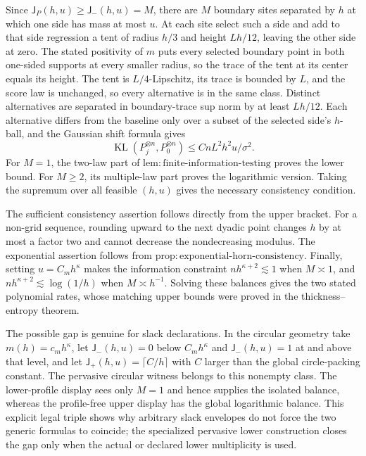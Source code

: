 Since \(\mathsf J_P(h,u)\ge\mathsf J_{-}(h,u)=M\), there are \(M\) boundary sites separated by \(h\) at which one side has mass at most \(u\). At each site select such a side and add to that side regression a tent of radius \(h/3\) and height \(Lh/12\), leaving the other side at zero. The stated positivity of \(m\) puts every selected boundary point in both one-sided supports at every smaller radius, so the trace of the tent at its center equals its height. The tent is \(L/4\)-Lipschitz, its trace is bounded by \(L\), and the score law is unchanged, so every alternative is in the same class. Distinct alternatives are separated in boundary-trace sup norm by at least \(Lh/12\). Each alternative differs from the baseline only over a subset of the selected side's \(h\)-ball, and the Gaussian shift formula gives
\[
 \operatorname{KL}(P_j^{\otimes n},P_0^{\otimes n})
 \le CnL^2h^2u/\sigma^2.
\]
For \(M=1\), the two-law part of \(\mathrm{lem:finite\text{-}information\text{-}testing}\) proves the lower bound. For \(M\ge2\), its multiple-law part proves the logarithmic version. Taking the supremum over all feasible \((h,u)\) gives the necessary consistency condition.

The sufficient consistency assertion follows directly from the upper bracket. For a non-grid sequence, rounding upward to the next dyadic point changes \(h\) by at most a factor two and cannot decrease the nondecreasing modulus. The exponential assertion follows from \(\mathrm{prop:exponential\text{-}horn\text{-}consistency}\). Finally, setting \(u=C_mh^\kappa\) makes the information constraint \(nh^{\kappa+2}\lesssim1\) when \(M\asymp1\), and \(nh^{\kappa+2}\lesssim\log(1/h)\) when \(M\asymp h^{-1}\). Solving these balances gives the two stated polynomial rates, whose matching upper bounds were proved in the thickness--entropy theorem.

The possible gap is genuine for slack declarations. In the circular geometry take \(m(h)=c_mh^\kappa\), let \(\mathsf J_{-}(h,u)=0\) below \(C_mh^\kappa\) and \(\mathsf J_{-}(h,u)=1\) at and above that level, and let \(\mathsf J_{+}(h,u)=\lceil C/h\rceil\) with \(C\) larger than the global circle-packing constant. The pervasive circular witness belongs to this nonempty class. The lower-profile display sees only \(M=1\) and hence supplies the isolated balance, whereas the profile-free upper display has the global logarithmic balance. This explicit legal triple shows why arbitrary slack envelopes do not force the two generic formulas to coincide; the specialized pervasive lower construction closes the gap only when the actual or declared lower multiplicity is used.